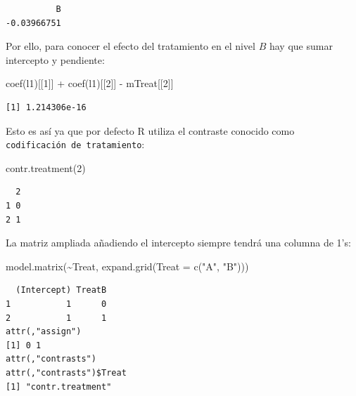 \documentclass[
  12pt,
  a4paper,
  extrafontsizes,
  onecolumn,
  openright,
  table]{memoir}
\newenvironment{Shaded}{\begin{snugshade}}{\end{snugshade}}
\newcommand{\AttributeTok}[1]{\textcolor[rgb]{0.40,0.45,0.13}{#1}}
\newcommand{\DecValTok}[1]{\textcolor[rgb]{0.68,0.00,0.00}{#1}}
\newcommand{\FunctionTok}[1]{\textcolor[rgb]{0.28,0.35,0.67}{#1}}
\newcommand{\NormalTok}[1]{\textcolor[rgb]{0.00,0.23,0.31}{#1}}
\newcommand{\SpecialCharTok}[1]{\textcolor[rgb]{0.37,0.37,0.37}{#1}}
\newcommand{\StringTok}[1]{\textcolor[rgb]{0.13,0.47,0.30}{#1}}
\begin{document}
\begin{verbatim}
          B 
-0.03966751 
\end{verbatim}

\normalsize

Por ello, para conocer el efecto del tratamiento en el nivel \(B\) hay
que sumar intercepto y pendiente:

\scriptsize

\begin{Shaded}
\begin{Highlighting}[]
\FunctionTok{coef}\NormalTok{(l1)[[}\DecValTok{1}\NormalTok{]] }\SpecialCharTok{+} \FunctionTok{coef}\NormalTok{(l1)[[}\DecValTok{2}\NormalTok{]] }\SpecialCharTok{{-}}\NormalTok{ mTreat[[}\DecValTok{2}\NormalTok{]]}
\end{Highlighting}
\end{Shaded}

\begin{verbatim}
[1] 1.214306e-16
\end{verbatim}

\normalsize

Esto es así ya que por defecto R utiliza el contraste conocido como
\texttt{codificación\ de\ tratamiento}:

\scriptsize

\begin{Shaded}
\begin{Highlighting}[]
\FunctionTok{contr.treatment}\NormalTok{(}\DecValTok{2}\NormalTok{)}
\end{Highlighting}
\end{Shaded}

\begin{verbatim}
  2
1 0
2 1
\end{verbatim}

\normalsize

La matriz ampliada añadiendo el intercepto siempre tendrá una columna de
1's:

\scriptsize

\begin{Shaded}
\begin{Highlighting}[]
\FunctionTok{model.matrix}\NormalTok{(}\SpecialCharTok{\textasciitilde{}}\NormalTok{Treat, }\FunctionTok{expand.grid}\NormalTok{(}\AttributeTok{Treat =} \FunctionTok{c}\NormalTok{(}\StringTok{"A"}\NormalTok{, }\StringTok{"B"}\NormalTok{)))}
\end{Highlighting}
\end{Shaded}

\begin{verbatim}
  (Intercept) TreatB
1           1      0
2           1      1
attr(,"assign")
[1] 0 1
attr(,"contrasts")
attr(,"contrasts")$Treat
[1] "contr.treatment"
\end{verbatim}
\end{document}
